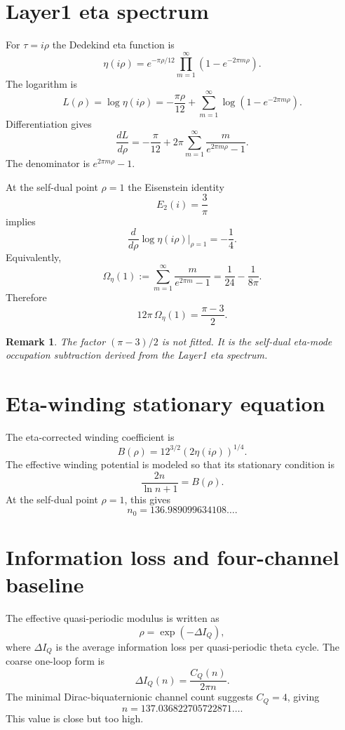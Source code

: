 \documentclass[12pt,a4paper]{article}
\newtheorem{remark}[definition]{Remark}
\begin{document}
\section{Layer1 eta spectrum}

For $\tau=i\rho$ the Dedekind eta function is
\[
  \eta(i\rho)
  =
  e^{-\pi\rho/12}
  \prod_{m=1}^{\infty}
  \left(1-e^{-2\pi m\rho}\right).
\]
The logarithm is
\[
  L(\rho)=\log\eta(i\rho)
  =
  -\frac{\pi\rho}{12}
  +
  \sum_{m=1}^{\infty}
  \log\left(1-e^{-2\pi m\rho}\right).
\]
Differentiation gives
\[
  \frac{dL}{d\rho}
  =
  -\frac{\pi}{12}
  +
  2\pi
  \sum_{m=1}^{\infty}
  \frac{m}{e^{2\pi m\rho}-1}.
\]
The denominator is $e^{2\pi m\rho}-1$.

At the self-dual point $\rho=1$ the Eisenstein identity
\[
  E_2(i)=\frac{3}{\pi}
\]
implies
\[
  \frac{d}{d\rho}\log\eta(i\rho)\bigg|_{\rho=1}
  =
  -\frac14.
\]
Equivalently,
\[
  \Omega_\eta(1):=
  \sum_{m=1}^{\infty}
  \frac{m}{e^{2\pi m}-1}
  =
  \frac{1}{24}-\frac{1}{8\pi}.
\]
Therefore
\[
  12\pi\,\Omega_\eta(1)
  =
  \frac{\pi-3}{2}.
\]

\begin{remark}
The factor $(\pi-3)/2$ is not fitted.  It is the self-dual eta-mode occupation
subtraction derived from the Layer1 eta spectrum.
\end{remark}

\section{Eta-winding stationary equation}

The eta-corrected winding coefficient is
\[
  B(\rho)
  =
  12^{3/2}
  \left(2\eta(i\rho)\right)^{1/4}.
\]
The effective winding potential is modeled so that its stationary condition is
\[
  \frac{2n}{\ln n+1}=B(\rho).
\]
At the self-dual point $\rho=1$, this gives
\[
  n_0=136.989099634108\ldots .
\]

\section{Information loss and four-channel baseline}

The effective quasi-periodic modulus is written as
\[
  \rho=\exp(-\Delta I_Q),
\]
where $\Delta I_Q$ is the average information loss per quasi-periodic theta
cycle.  The coarse one-loop form is
\[
  \Delta I_Q(n)=\frac{C_Q(n)}{2\pi n}.
\]
The minimal Dirac-biquaternionic channel count suggests $C_Q=4$, giving
\[
  n=137.036822705722871\ldots .
\]
This value is close but too high.
\end{document}
